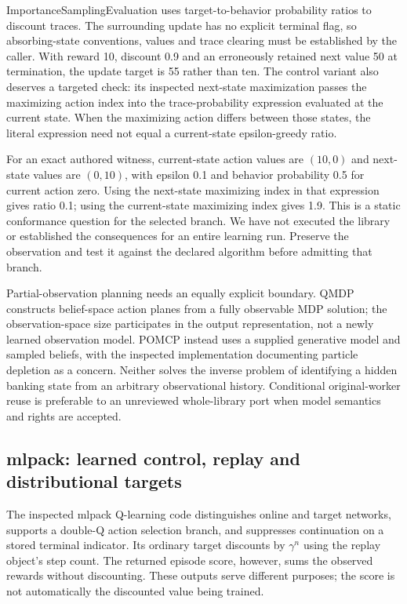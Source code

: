 ImportanceSamplingEvaluation uses target-to-behavior probability ratios to discount traces. The surrounding update has no explicit terminal flag, so absorbing-state conventions, values and trace clearing must be established by the caller. With reward 10, discount 0.9 and an erroneously retained next value 50 at termination, the update target is 55 rather than ten. The control variant also deserves a targeted check: its inspected next-state maximization passes the maximizing action index into the trace-probability expression evaluated at the current state. When the maximizing action differs between those states, the literal expression need not equal a current-state epsilon-greedy ratio.~\citep{exec24_policycxx_aitoolbox,exec24_policycxx_comparison}

For an exact authored witness, current-state action values are $(10,0)$ and next-state values are $(0,10)$, with epsilon 0.1 and behavior probability 0.5 for current action zero. Using the next-state maximizing index in that expression gives ratio 0.1; using the current-state maximizing index gives 1.9. This is a static conformance question for the selected branch. We have not executed the library or established the consequences for an entire learning run. Preserve the observation and test it against the declared algorithm before admitting that branch.~\citep{exec24_policycxx_aitoolbox,exec24_policycxx_comparison}

Partial-observation planning needs an equally explicit boundary. QMDP constructs belief-space action planes from a fully observable MDP solution; the observation-space size participates in the output representation, not a newly learned observation model. POMCP instead uses a supplied generative model and sampled beliefs, with the inspected implementation documenting particle depletion as a concern. Neither solves the inverse problem of identifying a hidden banking state from an arbitrary observational history. Conditional original-worker reuse is preferable to an unreviewed whole-library port when model semantics and rights are accepted.~\citep{exec24_policycxx_aitoolbox,exec24_policycxx_comparison}

\subsection{mlpack: learned control, replay and distributional targets}
The inspected mlpack Q-learning code distinguishes online and target networks, supports a double-Q action selection branch, and suppresses continuation on a stored terminal indicator. Its ordinary target discounts by $\gamma^{n}$ using the replay object's step count. The returned episode score, however, sums the observed rewards without discounting. These outputs serve different purposes; the score is not automatically the discounted value being trained.~\citep{exec24_policycxx_mlpack}


